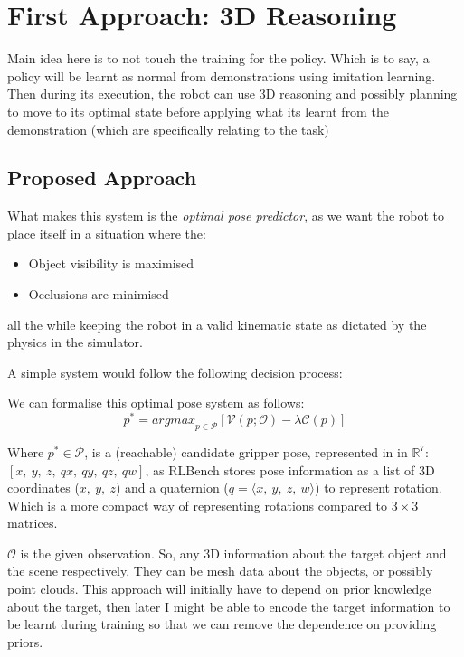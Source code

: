 \section{First Approach: 3D Reasoning}
Main idea here is to not touch the training for the policy. Which is to say, a policy will be learnt as normal from demonstrations using imitation learning. Then during its execution, the robot can use 3D reasoning and possibly planning to move to its optimal state before applying what its learnt from the demonstration (which are specifically relating to the task)

\subsection{Proposed Approach}
What makes this system is the \emph{optimal pose predictor}, as we want the robot to place itself in a situation where the:
\begin{itemize}
  \item Object visibility is maximised
  \item Occlusions are minimised
\end{itemize}
all the while keeping the robot in a valid kinematic state as dictated by the physics in the simulator.


A simple system would follow the following decision process:

We can formalise this optimal pose system as follows:
\[
p^* = {argmax}_{p \in \mathcal{P}}
  \left[
    \mathcal{V}\left(p; \mathcal{O}\right)
    - 
    \lambda\mathcal{C}\left(p\right)
  \right]
\]

Where \(p^* \in \mathcal{P}\), is a (reachable) candidate gripper pose, represented in in \(\mathbb{R}^7\): \( \left[ x, ~y, ~z, ~qx, ~qy, ~qz, ~qw\right]\), as RLBench stores pose information as a list of 3D coordinates (\(x, ~y, ~z\)) and a quaternion (\(q = \langle x, ~y, ~z, ~w \rangle \)) to represent rotation. Which is a more compact way of representing rotations compared to $3\times3$ matrices.

$\mathcal{O}$ is the given observation. So, any  3D information about the target object and the scene respectively. They can be mesh data about the objects, or possibly point clouds. This approach will initially have to depend on prior knowledge about the target, then later I might be able to encode the target information to be learnt during training so that we can remove the dependence on providing priors.

